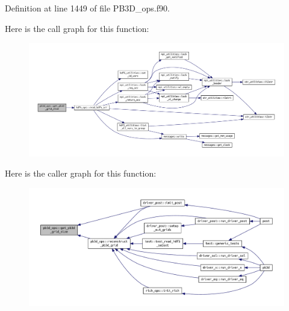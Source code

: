 Definition at line 1449 of file P\+B3\+D\+\_\+ops.\+f90.

Here is the call graph for this function\+:\nopagebreak
\begin{figure}[H]
\begin{center}
\leavevmode
\includegraphics[width=350pt]{namespacepb3d__ops_a528ae2857b7272d29d96f66ee60980a7_cgraph}
\end{center}
\end{figure}
Here is the caller graph for this function\+:\nopagebreak
\begin{figure}[H]
\begin{center}
\leavevmode
\includegraphics[width=350pt]{namespacepb3d__ops_a528ae2857b7272d29d96f66ee60980a7_icgraph}
\end{center}
\end{figure}
\mbox{\label{namespacepb3d__ops_a3142ca9965fa01b2777db762ed1a6eba}} 
